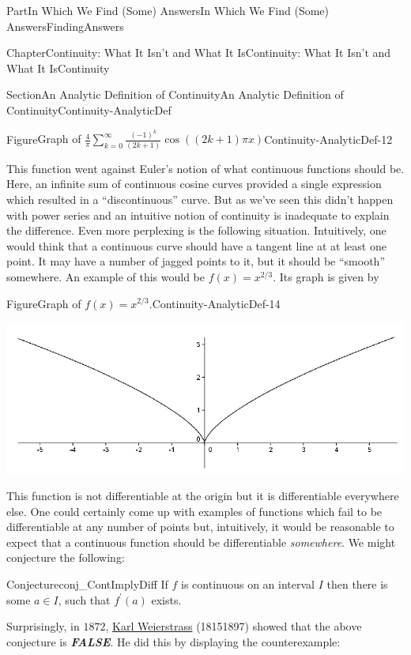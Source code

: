 \documentclass[oneside,10pt,]{book}
\newcommand{\alert}[1]{\textbf{\textit{#1}}}
\numberwithin{equation}{part}
\begin{document}
\begin{partptx}{Part}{In Which We Find (Some) Answers}{}{In Which We Find (Some) Answers}{}{}{FindingAnswers}
\begin{chapterptx}{Chapter}{Continuity: What It Isn't and What It Is}{}{Continuity: What It Isn't and What It Is}{}{}{Continuity}
\begin{sectionptx}{Section}{An Analytic Definition of Continuity}{}{An Analytic Definition of Continuity}{}{}{Continuity-AnalyticDef}
\begin{figureptx}{Figure}{Graph of \(\frac{4}{\pi}\sum_{k=0}^\infty\frac{\left(-1\right)^k}{\left(2k+1\right)} \cos \left(\left(2k+1\right)\pi x\right)\)}{Continuity-AnalyticDef-12}{}
\begin{image}{0.125}{0.75}{0.125}{}
\end{image}%
\tcblower
\end{figureptx}%
This function went against Euler's notion of what continuous functions should be.  Here, an infinite sum of continuous cosine curves provided a single expression which resulted in a ``discontinuous'' curve.  But as we've seen this didn't happen with power series and an intuitive notion of continuity is inadequate to explain the difference.  Even more perplexing is the following situation.  Intuitively, one would think that a continuous curve should have a tangent line at at least one point.  It may have a number of jagged points to it, but it should be ``smooth'' somewhere.  An example of this would be \(f(x)=x^{2/3}\).  Its graph is given by%
\begin{figureptx}{Figure}{Graph of \(f(x)=x^{2/3}\).}{Continuity-AnalyticDef-14}{}%
\begin{image}{0.125}{0.75}{0.125}{}%
\includegraphics[width=\linewidth]{external/images/Ch5fig2.png}
\end{image}%
\tcblower
\end{figureptx}%
This function is not differentiable at the origin but it is differentiable everywhere else.  One could certainly come up with examples of functions which fail to be differentiable at any number of points but, intuitively, it would be reasonable to expect that a continuous function should be differentiable \emph{somewhere}.  We might conjecture the following:%
\begin{conjecture}{Conjecture}{}{}{conj_ContImplyDiff}%
If \(f\) is continuous on an interval \(I\) then there is some \(a\in I\), such that \(f^\prime(a)\) exists.%
\end{conjecture}
 Surprisingly, in \(1872\), \href{https://mathshistory.st-andrews.ac.uk/Biographies/Weierstrass/}{Karl Weierstrass} (1815\textendash{}1897) showed that the above conjecture is \alert{FALSE}. He did this by displaying the counterexample:%
\begin{equation*}

\end{equation*}
\end{sectionptx}
\end{chapterptx}
\end{partptx}
\end{document}
